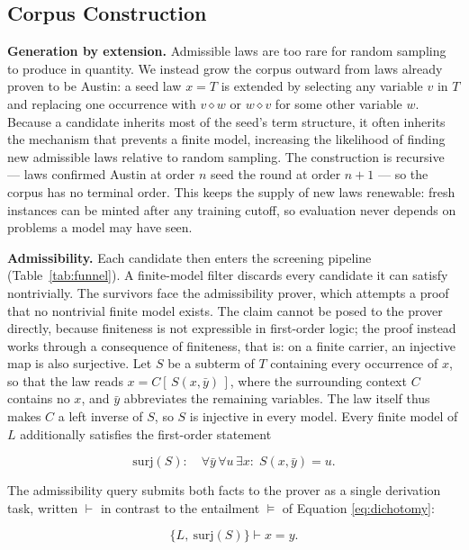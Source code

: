 \documentclass[letterpaper]{article} %
\newcommand{\op}{\diamond}
\begin{document}
\subsection{Corpus Construction}
\textbf{Generation by extension.} Admissible laws are too rare for random sampling to produce in quantity. We instead grow the corpus outward from laws already proven to be Austin: a seed law $x = T$ is extended by selecting any variable $v$ in $T$ and replacing one occurrence with $v \op w$ or $w \op v$ for some other variable $w$. Because a candidate inherits most of the seed's term structure, it often inherits the mechanism that prevents a finite model, increasing the likelihood of finding new admissible laws relative to random sampling. The construction is recursive --- laws confirmed Austin at order $n$ seed the round at order $n+1$ --- so the corpus has no terminal order. This keeps the supply of new laws renewable: fresh instances can be minted after any training cutoff, so evaluation never depends on problems a model may have seen.  

\textbf{Admissibility.} Each candidate then enters the screening pipeline (Table~\ref{tab:funnel}). A finite-model filter discards every candidate it can satisfy nontrivially. The survivors face the admissibility prover, which attempts a proof that no nontrivial finite model exists. The claim cannot be posed to the prover directly, because finiteness is not expressible in first-order logic; the proof instead works through a consequence of finiteness, that is: on a finite carrier, an injective map is also surjective. Let $S$ be a subterm of $T$ containing every occurrence of $x$, so that the law reads $x = C[\,S(x,\bar y)\,]$, where the surrounding context $C$ contains no $x$, and $\bar y$ abbreviates the remaining variables. The law itself thus makes $C$ a left inverse of $S$, so $S$ is injective in every model. Every finite model of $L$ additionally satisfies the first-order statement

\begin{equation}\label{eq:surj}
\mathrm{surj}(S)\colon\quad
\forall \bar y\,\forall u\,\exists x\colon\; S(x,\bar y) = u.
\end{equation}

The admissibility query submits both facts to the prover as a single derivation task, written $\vdash$ in contrast to the entailment $\models$ of Equation \eqref{eq:dichotomy}:

\begin{equation}\label{eq:admquery}
\{L,\ \mathrm{surj}(S)\} \vdash x = y.
\end{equation}
\end{document}

